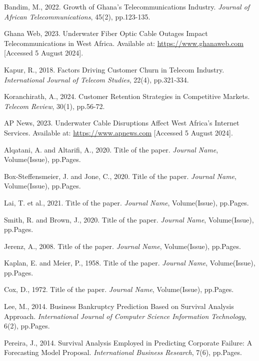 \documentclass[doublespacing]{report} %
\begin{document}
\begin{thebibliography}{9}

Bandim, M., 2022. Growth of Ghana's Telecommunications Industry. \textit{Journal of African Telecommunications}, 45(2), pp.123-135.

Ghana Web, 2023. Underwater Fiber Optic Cable Outages Impact Telecommunications in West Africa. Available at: \url{https://www.ghanaweb.com} [Accessed 5 August 2024].

Kapur, R., 2018. Factors Driving Customer Churn in Telecom Industry. \textit{International Journal of Telecom Studies}, 22(4), pp.321-334.

Koranchirath, A., 2024. Customer Retention Strategies in Competitive Markets. \textit{Telecom Review}, 30(1), pp.56-72.

AP News, 2023. Underwater Cable Disruptions Affect West Africa's Internet Services. Available at: \url{https://www.apnews.com} [Accessed 5 August 2024].

Alqatani, A. and Altarifi, A., 2020. Title of the paper. \textit{Journal Name}, Volume(Issue), pp.Pages.

Box-Steffensmeier, J. and Jone, C., 2020. Title of the paper. \textit{Journal Name}, Volume(Issue), pp.Pages.

Lai, T. et al., 2021. Title of the paper. \textit{Journal Name}, Volume(Issue), pp.Pages.

Smith, R. and Brown, J., 2020. Title of the paper. \textit{Journal Name}, Volume(Issue), pp.Pages.

Jerenz, A., 2008. Title of the paper. \textit{Journal Name}, Volume(Issue), pp.Pages.

Kaplan, E. and Meier, P., 1958. Title of the paper. \textit{Journal Name}, Volume(Issue), pp.Pages.

Cox, D., 1972. Title of the paper. \textit{Journal Name}, Volume(Issue), pp.Pages.

Lee, M., 2014. Business Bankruptcy Prediction Based on Survival Analysis Approach. \textit{International Journal of Computer Science Information Technology}, 6(2), pp.Pages.

Pereira, J., 2014. Survival Analysis Employed in Predicting Corporate Failure: A Forecasting Model Proposal. \textit{International Business Research}, 7(6), pp.Pages.


\end{thebibliography}
\end{document}
